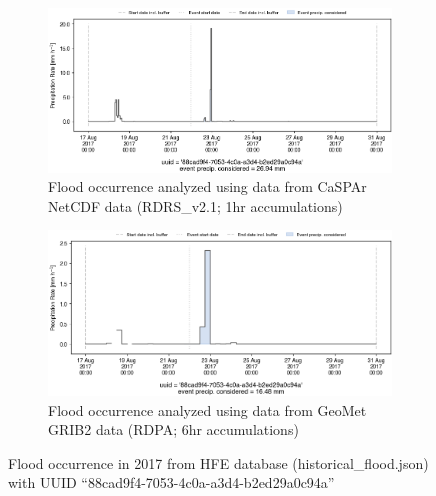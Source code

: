 \documentclass[10pt,a4paper,titlepage,parskip]{scrartcl}
\begin{document}
\begin{figure}[h]
	\begin{subfigure}[a]{1.0\textwidth}
		\centering
		\includegraphics[width=\linewidth]{figures/compare_Geomet_CaSPAr/interpolated_at_stations_occurrence_1008_identified-timesteps_RDRS_v2.1.png}
		\caption{Flood occurrence analyzed using data from CaSPAr NetCDF data (RDRS\_v2.1; 1hr accumulations)}
	\end{subfigure}
	\par\bigskip\bigskip
	\begin{subfigure}[b]{1.0\textwidth}
		\centering
		\includegraphics[width=\linewidth]{figures/compare_Geomet_CaSPAr/interpolated_at_stations_occurrence_1008_identified-timesteps_rdpa_10km_6f.png}
		\caption{Flood occurrence analyzed using data from GeoMet GRIB2 data (RDPA; 6hr accumulations)}
	\end{subfigure}
	\par\bigskip\bigskip
	\caption{Flood occurrence in 2017 from HFE database (historical\_flood.json) with UUID ``88cad9f4-7053-4c0a-a3d4-b2ed29a0c94a''}
\end{figure}
\pagebreak
\end{document}
